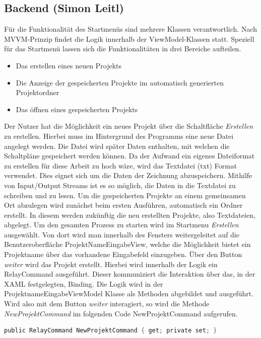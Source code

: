 \subsection{Backend (Simon Leitl)}
Für die Funktionalität des Startmenüs sind mehrere Klassen verantwortlich. Nach MVVM-Prinzip findet die Logik innerhalb der 
ViewModel-Klassen statt. Speziell für das Startmenü lassen sich die Funktionalitäten in drei Bereiche aufteilen.
\begin{itemize}
    \item Das erstellen eines neuen Projekts
    \item Die Anzeige der gespeicherten Projekte im automatisch generierten Projektordner  
    \item Das öffnen eines gespeicherten Projekts
\end{itemize}
Der Nutzer hat die Möglichkeit ein neues 
Projekt über die Schaltfläche \textit{Erstellen} zu erstellen. Hierbei muss im Hintergrund des 
Programms eine neue Datei angelegt werden. Die Datei wird später Daten enthalten, mit welchen die Schaltpläne gespeichert werden können. 
Da der Aufwand ein eigenes Dateiformat zu erstellen für diese Arbeit zu hoch wäre, wird das Textdatei (txt) Format verwendet. Dies eignet 
sich um die Daten der Zeichnung abzuspeichern. Mithilfe von Input/Output Streams ist es so möglich, die Daten in die Textdatei zu schreiben 
und zu lesen. Um die gespeicherten Projekte an einem gemeinsamen Ort abzulegen wird zunächst beim ersten Ausführen, automatisch ein Ordner 
erstellt. In diesem werden zukünftig die neu erstellten Projekte, also Textdateien, abgelegt. 
Um den gesamten Prozess zu starten wird im Startmenu \textit{Erstellen} ausgewählt. Von dort wird man innerhalb des Fensters 
weitergeleitet auf die Benutzeroberfläche ProjektNameEingabeView, welche die Möglichkeit bietet ein Projektname über das vorhandene 
Eingabefeld einzugeben. Über den Button \textit{weiter} wird das Projekt erstellt. Hierbei wird innerhalb der Logik ein RelayCommand 
ausgeführt. Dieser kommuniziert die Interaktion über das, in der XAML festgelegten, Binding. Die Logik wird in der 
ProjektnameEingabeViewModel Klasse als Methoden abgebildet und ausgeführt. Wird also mit dem Button \textit{weiter} interagiert, 
so wird die Methode \textit{NewProjektCommand} im folgenden Code \refname{NewProjektCommand} aufgerufen. 
\linebreak
\begin{lstlisting}[language=C,
    frame=single,           % Ein Rahmen um den Code
    framexleftmargin=15pt,  % Rahmen link von den Zahlen
    style=algoBericht,
    label={NewProjektCommand},
    captionpos=b,           % Caption unter den Code setzen
    caption={NewProjektCommand}]
    public RelayCommand NewProjektCommand { get; private set; }
\end{lstlisting}
